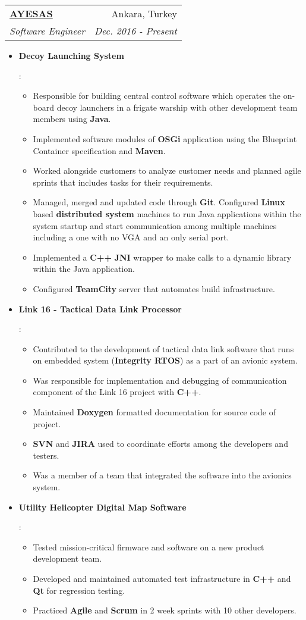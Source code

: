 \documentclass[letterpaper,11pt]{article}
\makeatletter
\newcommand{\resumeItem}[2]{
  \item\small{
    \textbf{#1}{:\newline#2 \vspace{-2pt}}
  }
}
\newcommand{\resumeSubheading}[4]{
  \vspace{-1pt}\item
    \begin{tabular*}{0.97\textwidth}[t]{l@{\extracolsep{\fill}}r}
      \textbf{#1} & #2 \\
      \textit{\small#3} & \textit{\small #4} \\
    \end{tabular*}\vspace{-5pt}
}
\newcommand{\resumeItemListStart}{\begin{itemize}}
\newcommand{\resumeItemListEnd}{\end{itemize}\vspace{-5pt}}
\makeatother
\begin{document}
    \resumeSubheading
      {\href{https://www.ayesas.com/en}{AYESAS}}{Ankara, Turkey}
      {Software Engineer}{Dec. 2016 - Present}
      \resumeItemListStart
        \resumeItem{Decoy Launching System}
          {\begin{itemize}
              \item Responsible for building central control software which operates the on-board decoy launchers in a frigate warship with other development team members using \textbf{Java}.
              \item Implemented software modules of \textbf{OSGi} application using the Blueprint Container specification and \textbf{Maven}.
              \item Worked alongside customers to analyze customer needs and planned agile sprints that includes tasks for their requirements.
              \item Managed, merged and updated code through \textbf{Git}. Configured \textbf{Linux} based \textbf{distributed system} machines to run Java applications within the system startup and start communication among multiple machines including a one with no VGA and an only serial port.
              \item Implemented a \textbf{C++} \textbf{JNI} wrapper to make calls to a dynamic library within the Java application. 
              \item Configured \textbf{TeamCity} server that automates build infrastructure.
          \end{itemize}    
          }
        \resumeItem{Link 16 - Tactical Data Link Processor}
         {
         \begin{itemize}
             \item Contributed to the development of tactical data link software that runs on embedded system (\textbf{Integrity RTOS}) as a part of an avionic system. \item Was responsible for implementation and debugging of communication component of the Link 16 project with \textbf{C++}.
             \item Maintained \textbf{Doxygen} formatted documentation for source code of project. 
             \item\textbf{SVN} and \textbf{JIRA} used to coordinate efforts among the developers and testers.
             \item Was a member of a team that integrated the software into the avionics system.
         \end{itemize} 
         }
         \resumeItem{Utility Helicopter Digital Map Software}
          {\begin{itemize}
              \item Tested mission-critical firmware and software on a new product development team. 
              \item Developed and maintained automated test infrastructure in \textbf{C++} and \textbf{Qt} for regression testing.
              \item Practiced \textbf{Agile} and \textbf{Scrum} in 2 week sprints with 10 other developers.
          \end{itemize}
          }
      \resumeItemListEnd
\end{document}

